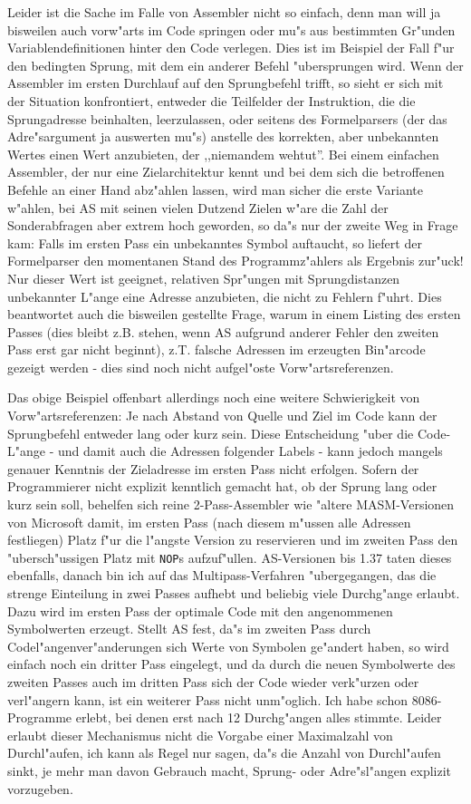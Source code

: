 \documentclass[12pt,a4paper,twoside]{report}
\newcommand{\tty}[1]{{\tt #1}}
\begin{document}
Leider ist die Sache im Falle von Assembler nicht so einfach, denn man
will ja bisweilen auch vorw"arts im Code springen oder mu"s aus bestimmten
Gr"unden Variablendefinitionen hinter den Code verlegen.  Dies ist
im Beispiel der Fall f"ur den bedingten Sprung, mit dem ein anderer
Befehl "ubersprungen wird.  Wenn der Assembler im ersten Durchlauf auf
den Sprungbefehl trifft, so sieht er sich mit der Situation konfrontiert,
entweder die Teilfelder der Instruktion, die die Sprungadresse beinhalten,
leerzulassen, oder seitens des Formelparsers (der das Adre"sargument ja
auswerten mu"s) anstelle des korrekten, aber unbekannten Wertes einen Wert
anzubieten, der ,,niemandem wehtut''.  Bei einem einfachen Assembler, der
nur eine Zielarchitektur kennt und bei dem sich die betroffenen Befehle
an einer Hand abz"ahlen lassen, wird man sicher die erste Variante w"ahlen,
bei AS mit seinen vielen Dutzend Zielen w"are die Zahl der Sonderabfragen
aber extrem hoch geworden, so da"s nur der zweite Weg in Frage kam: Falls
im ersten Pass ein unbekanntes Symbol auftaucht, so liefert der Formelparser
den momentanen Stand des Programmz"ahlers als Ergebnis zur"uck!  Nur dieser
Wert ist geeignet, relativen Spr"ungen mit Sprungdistanzen unbekannter
L"ange eine Adresse anzubieten, die nicht zu Fehlern f"uhrt.  Dies beantwortet
auch die bisweilen gestellte Frage, warum in einem Listing des ersten
Passes (dies bleibt z.B. stehen, wenn AS aufgrund anderer Fehler den
zweiten Pass erst gar nicht beginnt), z.T. falsche Adressen im erzeugten
Bin"arcode gezeigt werden - dies sind noch nicht aufgel"oste 
Vorw"artsreferenzen.  

Das obige Beispiel offenbart allerdings noch eine weitere Schwierigkeit
von Vorw"artsreferenzen: Je nach Abstand von Quelle und Ziel im Code kann
der Sprungbefehl entweder lang oder kurz sein.  Diese Entscheidung "uber
die Code-L"ange - und damit auch die Adressen folgender Labels - kann
jedoch mangels genauer Kenntnis der Zieladresse im ersten Pass nicht
erfolgen.  Sofern der Programmierer nicht explizit kenntlich gemacht hat,
ob der Sprung lang oder kurz sein soll, behelfen sich reine 2-Pass-Assembler
wie "altere MASM-Versionen von Microsoft damit, im ersten Pass (nach diesem
m"ussen alle Adressen festliegen) Platz f"ur die l"angste Version zu
reservieren und im zweiten Pass den "ubersch"ussigen Platz mit \tty{NOP}s
aufzuf"ullen.  AS-Versionen bis 1.37 taten dieses ebenfalls, danach bin
ich auf das Multipass-Verfahren "ubergegangen, das die strenge Einteilung
in zwei Passes aufhebt und beliebig viele Durchg"ange erlaubt.  Dazu wird
im ersten Pass der optimale Code mit den angenommenen Symbolwerten erzeugt.
Stellt AS fest, da"s im zweiten Pass durch Codel"angenver"anderungen sich
Werte von Symbolen ge"andert haben, so wird einfach noch ein dritter Pass
eingelegt, und da durch die neuen Symbolwerte des zweiten Passes auch
im dritten Pass sich der Code wieder verk"urzen oder verl"angern kann,
ist ein weiterer Pass nicht unm"oglich.  Ich habe schon 8086-Programme
erlebt, bei denen erst nach 12 Durchg"angen alles stimmte.  Leider
erlaubt dieser Mechanismus nicht die Vorgabe einer Maximalzahl von
Durchl"aufen, ich kann als Regel nur sagen, da"s die Anzahl von Durchl"aufen
sinkt, je mehr man davon Gebrauch macht, Sprung- oder Adre"sl"angen explizit
vorzugeben.
\end{document}
